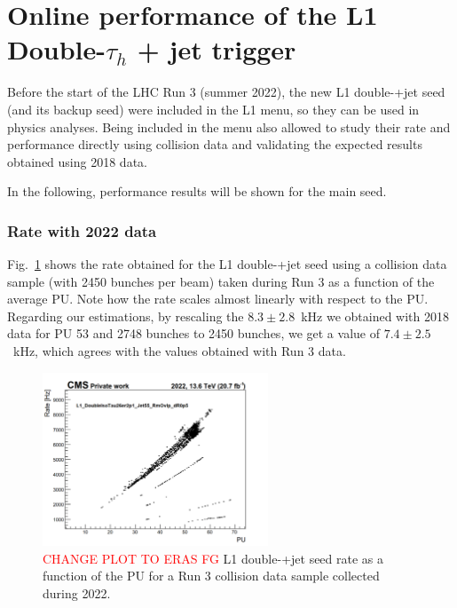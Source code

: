 \documentclass[../main.tex]{subfiles}
\begin{document}
\section{Online performance of the L1 Double-$\tau_h$ + jet trigger}

Before the start of the LHC Run 3 (summer 2022), the new L1 double-\tauh{}+jet seed (and its backup seed) were included in the L1 menu, so they can be used in physics analyses. Being included in the menu also allowed to study their rate and performance directly using collision data and validating the expected results obtained using 2018 data.

In the following, performance results will be shown for the main seed.

\subsubsection{Rate with 2022 data}

Fig.~\ref{hh:fig:l1_rate_run3} shows the rate obtained for the L1 double-\tauh{}+jet seed using a collision data sample (with 2450 bunches per beam) taken during Run 3 as a function of the average PU. Note how the rate scales almost linearly with respect to the PU. Regarding our estimations, by rescaling the $8.3\pm2.8$~kHz we obtained with 2018 data for PU 53 and 2748 bunches to 2450 bunches, we get a value of $7.4\pm2.5$~kHz, which agrees with the values obtained with Run 3 data.


\begin{figure}[h!]
\begin{center}
\includegraphics[width=0.6\textwidth]{Images/L1_rate}
\end{center}
\caption{\textcolor{red}{CHANGE PLOT TO ERAS FG} L1 double-\tauh{}+jet seed rate as a function of the PU for a Run 3 collision data sample collected during 2022.}
\label{hh:fig:l1_rate_run3}
\end{figure}
\end{document}

